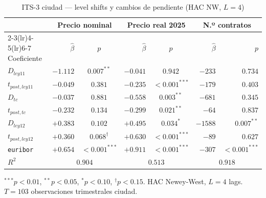 \documentclass[12pt,a4paper]{article}
\begin{document}
\begin{table}[H]
\caption{ITS-3 ciudad --- level shifts y cambios de pendiente (HAC NW, $L=4$)}
\label{tab:its3}
\centering
\small
\begin{threeparttable}
\begin{tabular}{lrcrcrr}
\toprule
 & \multicolumn{2}{c}{Precio nominal} & \multicolumn{2}{c}{Precio real 2025} & \multicolumn{2}{c}{N.º contratos} \\
\cmidrule(lr){2-3}\cmidrule(lr){4-5}\cmidrule(lr){6-7}
Coeficiente & $\hat{\beta}$ & $p$ & $\hat{\beta}$ & $p$ & $\hat{\beta}$ & $p$ \\
\midrule
$D_{ley11}$        & $-1.112$ & $0.007^{**}$ & $-0.041$ & $0.942$       & $-233$ & $0.734$ \\
$t_{post,ley11}$   & $-0.049$ & $0.381$      & $-0.235$ & $<0.001^{***}$& $-179$ & $0.403$ \\
$D_{tc}$           & $-0.037$ & $0.881$      & $-0.558$ & $0.003^{**}$  & $-681$ & $0.345$ \\
$t_{post,tc}$      & $-0.232$ & $0.134$      & $-0.299$ & $0.021^{**}$  & $-64$  & $0.837$ \\
$D_{ley12}$        & $+0.383$ & $0.102$      & $+0.495$ & $0.034^{*}$   & $-1588$& $0.007^{**}$ \\
$t_{post,ley12}$   & $+0.360$ & $0.068^{\dag}$ & $+0.630$ & $<0.001^{***}$&$-89$ & $0.627$ \\
\texttt{euribor}   & $+0.654$ & $<0.001^{***}$ & $+0.911$ & $<0.001^{***}$&$-307$ & $<0.001^{***}$ \\
\midrule
$R^2$              & \multicolumn{2}{c}{$0.904$} & \multicolumn{2}{c}{$0.513$} & \multicolumn{2}{c}{$0.918$} \\
\bottomrule
\end{tabular}
\begin{tablenotes}
\small\item $^{***}p<0.01$, $^{**}p<0.05$, $^{*}p<0.10$, $^{\dag}p<0.15$.
HAC Newey-West, $L=4$ lags. $T=103$ observaciones trimestrales ciudad.
\end{tablenotes}
\end{threeparttable}
\end{table}
\end{document}
